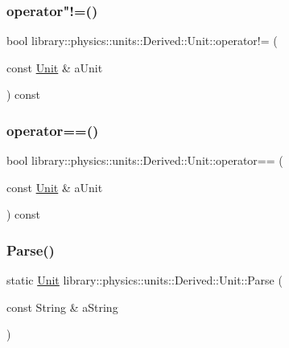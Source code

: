 \subsubsection{\texorpdfstring{operator"!=()}{operator!=()}}
{\footnotesize\ttfamily bool library\+::physics\+::units\+::\+Derived\+::\+Unit\+::operator!= (\begin{DoxyParamCaption}\item[{const \hyperlink{classlibrary_1_1physics_1_1units_1_1_derived_1_1_unit}{Unit} \&}]{a\+Unit }\end{DoxyParamCaption}) const}

\mbox{\label{classlibrary_1_1physics_1_1units_1_1_derived_1_1_unit_a207d8431c78316e5fd209ebb9441775f}} 
\subsubsection{\texorpdfstring{operator==()}{operator==()}}
{\footnotesize\ttfamily bool library\+::physics\+::units\+::\+Derived\+::\+Unit\+::operator== (\begin{DoxyParamCaption}\item[{const \hyperlink{classlibrary_1_1physics_1_1units_1_1_derived_1_1_unit}{Unit} \&}]{a\+Unit }\end{DoxyParamCaption}) const}

\mbox{\label{classlibrary_1_1physics_1_1units_1_1_derived_1_1_unit_aa712ff5245e4badf615c04f8e1cbdb51}} 
\subsubsection{\texorpdfstring{Parse()}{Parse()}}
{\footnotesize\ttfamily static \hyperlink{classlibrary_1_1physics_1_1units_1_1_derived_1_1_unit}{Unit} library\+::physics\+::units\+::\+Derived\+::\+Unit\+::\+Parse (\begin{DoxyParamCaption}\item[{const String \&}]{a\+String }\end{DoxyParamCaption})\hspace{0.3cm}{\ttfamily [static]}}

